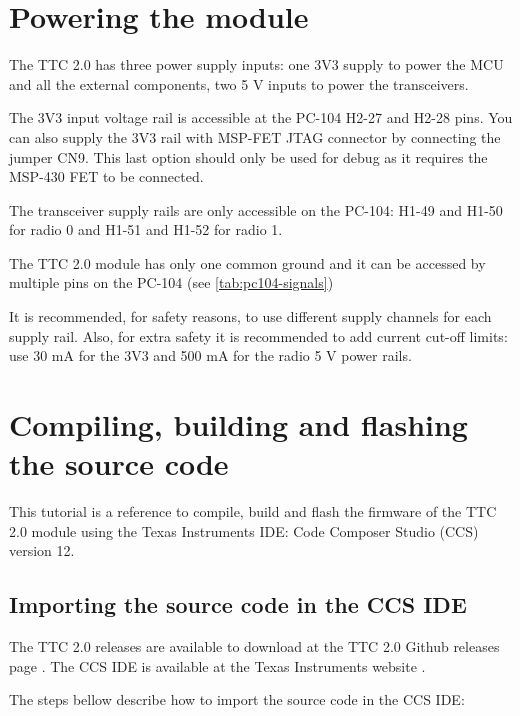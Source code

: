 \section{Powering the module}

The TTC 2.0 has three power supply inputs: one 3V3 supply to power the MCU and all the external components, two 5 V inputs to power the transceivers.

The 3V3 input voltage rail is accessible at the PC-104 H2-27 and H2-28 pins. You can also supply the 3V3 rail with MSP-FET JTAG connector by connecting the jumper CN9. This last option should only be used for debug as it requires the MSP-430 FET to be connected.

The transceiver supply rails are only accessible on the PC-104: H1-49 and H1-50 for radio 0 and H1-51 and H1-52 for radio 1. 

The TTC 2.0 module has only one common ground and it can be accessed by multiple pins on the PC-104 (see \autoref {tab:pc104-signals})

It is recommended, for safety reasons, to use different supply channels for each supply rail. Also, for extra safety it is recommended to add current cut-off limits: use 30 mA for the 3V3 and 500 mA for the radio 5 V power rails. 

\section{Compiling, building and flashing the source code}

This tutorial is a reference to compile, build and flash the firmware of the TTC 2.0 module using the Texas Instruments IDE: Code Composer Studio (CCS) version 12.


\subsection{Importing the source code in the CCS IDE}

The TTC 2.0 releases are available to download at the TTC 2.0 Github releases page \cite{ttc2-releases}. The CCS IDE is available at the Texas Instruments website \cite{ccs-studio}.

The steps bellow describe how to import the source code in the CCS IDE:

